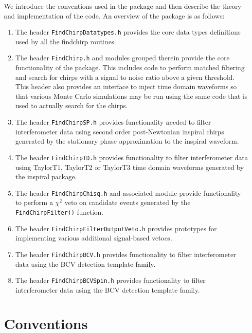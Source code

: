 We introduce the conventions used in the package and then describe the theory
and implementation of the code. An overview of the package is as follows:
\begin{enumerate}
\item The header \texttt{FindChirpDatatypes.h} provides the core data types
definitions used by all the findchirp routines.

\item The header \texttt{FindChirp.h} and modules grouped therein provide the
core functionality of the package. This includes code to perform matched
filtering and search for chirps with a signal to noise ratio above a given
threshold.  This header also provides an interface to inject time domain
waveforms so that various Monte Carlo simulations may be run using the same
code that is used to actually search for the chirps.

\item The header \texttt{FindChirpSP.h} provides functionality needed to
filter interferometer data using second order post-Newtonian inspiral chirps
generated by the stationary phase approximation to the inspiral waveform.

\item The header \texttt{FindChirpTD.h} provides functionality to filter
interferometer data using TaylorT1, TaylorT2 or TaylorT3 time domain waveforms
generated by the inspiral package.

\item The header \texttt{FindChirpChisq.h} and associated module provide
functionality to perform a $\chi^2$ veto on candidate events generated by the
\texttt{FindChirpFilter()} function.

\item The header \texttt{FindChirpFilterOutputVeto.h} provides prototypes for
implementing various additional signal-based vetoes.

\item The header \texttt{FindChirpBCV.h} provides functionality to filter
interferometer data using the BCV detection template family.

\item The header \texttt{FindChirpBCVSpin.h} provides functionality to filter
interferometer data using the BCV detection template family.

\end{enumerate}

\newpage

\section{Conventions}

